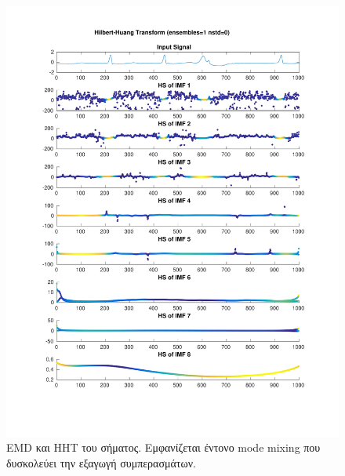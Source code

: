 \documentclass[11pt,a4paper]{article}
\begin{document}
\begin{figure}[H]
\begin{minipage}{0.48\textwidth}
	\includegraphics[width=\textwidth]{fig/221l1_hht.pdf}
\end{minipage}
\vfill
\caption{EMD και HHT του σήματος. Εμφανίζεται έντονο mode mixing που δυσκολεύει την εξαγωγή συμπερασμάτων.}
\label{fig:221l1_hht}
\end{figure}
\end{document}
